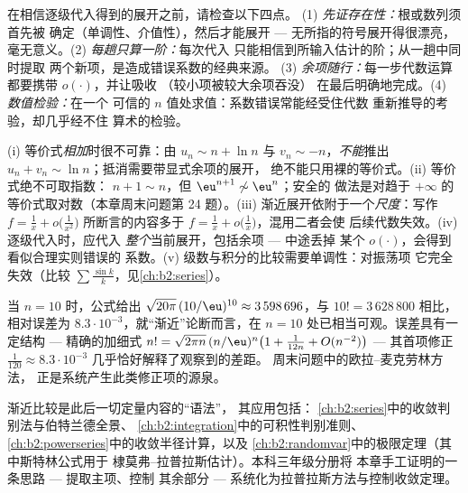 \begin{method}[逐级代入检查清单]\label{met:b2:comparison:checklist}
在相信逐级代入得到的展开之前，请检查以下四点。
(1) \emph{先证存在性：}根或数列须首先被
确定（单调性、介值性），然后才能展开
--- 无所指的符号展开得很漂亮，
毫无意义。(2) \emph{每趟只算一阶：}每次代入
只能相信到所输入估计的阶；从一趟中同时提取
两个新项，是造成错误系数的经典来源。
(3) \emph{余项随行：}每一步代数运算都要携带
$o(\cdot)$，并让吸收
（较小项被较大余项吞没）
在最后明确地完成。(4) \emph{数值检验：}在一个
可信的 $n$ 值处求值：系数错误常能经受住代数
重新推导的考验，却几乎经不住
算术的检验。
\end{method}

\begin{remark}[常见陷阱]\label{rem:b2:comparison:pitfalls}
(i) 等价式\emph{相加}时很不可靠：由 $u_n \sim n + \ln n$ 与
$v_n \sim -n$，\emph{不能}推出 $u_n + v_n \sim \ln
n$；抵消需要带显式余项的展开，
绝不能只用裸的等价式。(ii) 等价式绝不可取指数：
$n + 1 \sim n$，但 $\eu^{n+1} \not\sim \eu^n$；安全的
做法是对趋于
$+\infty$ 的等价式取对数（本章周末问题第 24 题）。(iii)
渐近展开依附于一个\emph{尺度}：写作
$f = \frac1x + o\bigl(\frac1{x^2}\bigr)$ 所断言的内容多于 $f =
\frac1x + o\bigl(\frac1x\bigr)$，混用二者会使
后续代数失效。(iv) 逐级代入时，应代入
\emph{整个}当前展开，包括余项 --- 中途丢掉
某个 $o(\cdot)$，会得到看似合理实则错误的
系数。(v) 级数与积分的比较需要单调性：对振荡项
它完全失效（比较
$\sum\frac{\sin k}k$，见\cref{ch:b2:series}）。
\end{remark}

\begin{example}[斯特林公式的数值检验]\label{ex:b2:comparison:stirlingnum}
当 $n = 10$ 时，公式给出 $\sqrt{20\pi}\,(10/\eu)^{10}
\approx 3\,598\,696$，与 $10! = 3\,628\,800$ 相比，相对误差为
$8.3\cdot10^{-3}$，就“渐近”论断而言，在
$n = 10$ 处已相当可观。误差具有一定结构 --- 精确的加细式 $n!
= \sqrt{2\pi n}\,(n/\eu)^n\bigl(1 + \frac1{12n} +
O(n^{-2})\bigr)$ --- 其首项修正 $\frac1{120} \approx
8.3\cdot10^{-3}$ 几乎恰好解释了观察到的差距。
周末问题中的欧拉–麦克劳林方法，
正是系统产生此类修正项的源泉。
\end{example}

\begin{remark}[本章的应用]
渐近比较是此后一切定量内容的“语法”，
其应用包括：
\cref{ch:b2:series}中的收敛判别法与伯特兰德全景、
\cref{ch:b2:integration}中的可积性判别准则、
\cref{ch:b2:powerseries}中的收敛半径计算，以及
\cref{ch:b2:randomvar}中的极限定理（其中斯特林公式用于
棣莫弗–拉普拉斯估计）。本科三年级分册将
本章手工证明的一条思路 --- 提取主项、控制
其余部分 --- 系统化为拉普拉斯方法与控制收敛定理。
\end{remark}

